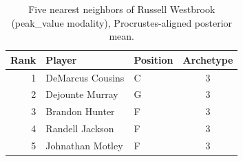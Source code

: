 \begin{table}[htbp]
  \centering\small
  \begin{tabular}{rllc}
    \toprule
    Rank & Player & Position & Archetype \\
    \midrule
    1 & DeMarcus Cousins & C & 3 \\
    2 & Dejounte Murray & G & 3 \\
    3 & Brandon Hunter & F & 3 \\
    4 & Randell Jackson & F & 3 \\
    5 & Johnathan Motley & F & 3 \\
    \bottomrule
  \end{tabular}
  \caption{Five nearest neighbors of Russell Westbrook (peak_value modality), Procrustes-aligned posterior mean.}
  \label{tab:Russell_Westbrook_neighbors_peak_value}
\end{table}


